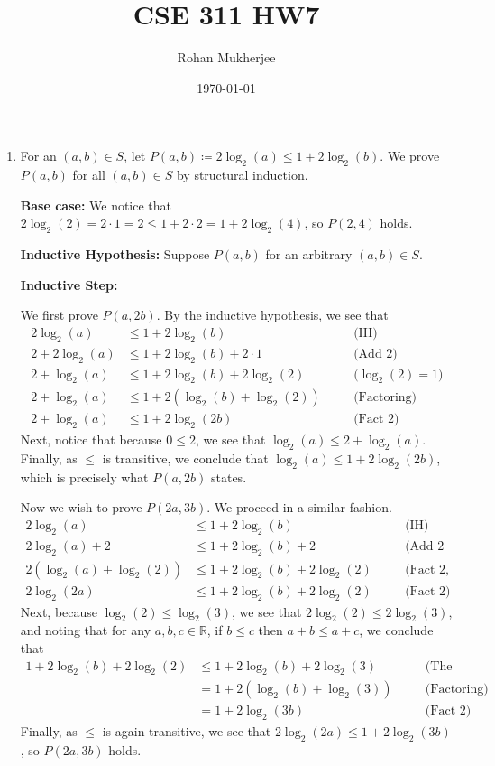 \documentclass[12pt]{article}
\title{CSE 311 HW7}
\date{\today}
\author{Rohan Mukherjee}
\def\mbb#1{\mathbb{#1}}
\def\bR{\mbb{R}}
\theoremstyle{definition}
\theoremstyle{remark}
\newcommand{\justif}[1]{&\quad &\text{(#1)}}
\begin{document}
	\maketitle
	\begin{enumerate}[leftmargin=\labelsep]
		\item For an $(a, b) \in S$, let $P(a, b) \coloneq 2\log_2(a) \leq 1 + 2\log_2(b)$. We prove $P(a, b)$ for all $(a, b) \in S$ by structural induction.
		
		\textbf{Base case: } We notice that $2 \log_2(2) = 2 \cdot 1 = 2 \leq 1 + 2 \cdot 2 = 1 + 2 \log_2(4)$, so $P(2, 4)$ holds.
		
		\textbf{Inductive Hypothesis: } Suppose $P(a, b)$ for an arbitrary $(a, b) \in S$.
		
		\textbf{Inductive Step: } 
		
		We first prove $P(a, 2b)$. By the inductive hypothesis, we see that
		\begin{align*}
			2\log_2(a) &\leq 1 + 2\log_2(b) \justif{IH} \\
			2 + 2\log_2(a) &\leq 1 + 2 \log_2(b) + 2 \cdot 1 \justif{Add 2} \\
			2 + \log_2(a) &\leq 1 + 2\log_2(b) + 2 \log_2(2) \justif{$\log_2(2) = 1$} \\
			2 + \log_2(a) &\leq 1 + 2(\log_2(b)+\log_2(2)) \justif{Factoring} \\
			2 + \log_2(a) &\leq 1 + 2\log_2(2b) \justif{Fact 2}
		\end{align*}
		Next, notice that because $0 \leq 2$, we see that $\log_2(a) \leq 2 + \log_2(a)$. Finally, as $\leq$ is transitive, we conclude that $\log_2(a) \leq 1 + 2\log_2(2b)$, which is precisely what $P(a, 2b)$ states.
		
		Now we wish to prove $P(2a, 3b)$. We proceed in a similar fashion.
		\begin{align*}
			2\log_2(a) &\leq 1 + 2\log_2(b) \justif{IH} \\
			2\log_2(a) + 2 &\leq 1 + 2\log_2(b) + 2 \justif{Add 2 to both sides, factor} \\
			2(\log_2(a)+\log_2(2)) &\leq 1 + 2\log_2(b) + 2\log_2(2) \justif{Fact 2, factoring} \\
			2\log_2(2a) &\leq 1 + 2\log_2(b) + 2\log_2(2) \justif{Fact 2}
		\end{align*}
		Next, because $\log_2(2) \leq \log_2(3)$, we see that $2\log_2(2) \leq 2\log_2(3)$, and noting that for any $a, b, c \in \bR$, if $b \leq c$ then $a + b \leq a + c$, we conclude that
		\begin{align*}
			1 + 2\log_2(b) + 2\log_2(2) &\leq 1 + 2\log_2(b) + 2\log_2(3) \justif{The second part of the previous sentence}\\
			&= 1 + 2(\log_2(b)+\log_2(3)) \justif{Factoring} \\
			&= 1 + 2\log_2(3b) \justif{Fact 2}
		\end{align*}
		Finally, as $\leq$ is again transitive, we see that $2\log_2(2a) \leq 1 + 2\log_2(3b)$, so $P(2a, 3b)$ holds. 
		

\end{enumerate}
\end{document}
